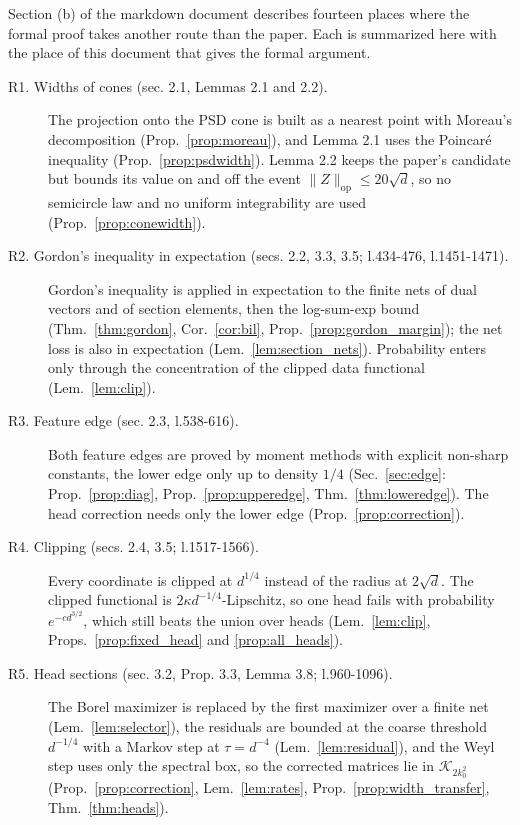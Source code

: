 \documentclass[11pt]{article}
\newcommand{\norm}[1]{\lVert #1\rVert}
\newcommand{\op}{\mathrm{op}}
\newcommand{\sqd}{\sqrt{d}}
\newcommand{\cone}{\mathcal{K}}
\theoremstyle{plain}
\theoremstyle{definition}
\begin{document}
Section (b) of the markdown document describes fourteen places where the
formal proof takes another route than the paper. Each is summarized here
with the place of this document that gives the formal argument.

\begin{description}
\item[R1. Widths of cones (sec. 2.1, Lemmas 2.1 and 2.2).] The projection onto the PSD cone is built as a nearest point with Moreau's decomposition (Prop.~\ref{prop:moreau}), and Lemma 2.1 uses the Poincar\'e inequality (Prop.~\ref{prop:psdwidth}). Lemma 2.2 keeps the paper's candidate but bounds its value on and off the event $\norm{Z}_\op \le 20\sqd$, so no semicircle law and no uniform integrability are used (Prop.~\ref{prop:conewidth}).
\item[R2. Gordon's inequality in expectation (secs. 2.2, 3.3, 3.5; l.434-476, l.1451-1471).] Gordon's inequality is applied in expectation to the finite nets of dual vectors and of section elements, then the log-sum-exp bound (Thm.~\ref{thm:gordon}, Cor.~\ref{cor:bil}, Prop.~\ref{prop:gordon_margin}); the net loss is also in expectation (Lem.~\ref{lem:section_nets}). Probability enters only through the concentration of the clipped data functional (Lem.~\ref{lem:clip}).
\item[R3. Feature edge (sec. 2.3, l.538-616).] Both feature edges are proved by moment methods with explicit non-sharp constants, the lower edge only up to density $1/4$ (Sec.~\ref{sec:edge}: Prop.~\ref{prop:diag}, Prop.~\ref{prop:upperedge}, Thm.~\ref{thm:loweredge}). The head correction needs only the lower edge (Prop.~\ref{prop:correction}).
\item[R4. Clipping (secs. 2.4, 3.5; l.1517-1566).] Every coordinate is clipped at $d^{1/4}$ instead of the radius at $2\sqd$. The clipped functional is $2\kappa d^{-1/4}$-Lipschitz, so one head fails with probability $e^{-cd^{3/2}}$, which still beats the union over heads (Lem.~\ref{lem:clip}, Props.~\ref{prop:fixed_head} and \ref{prop:all_heads}).
\item[R5. Head sections (sec. 3.2, Prop. 3.3, Lemma 3.8; l.960-1096).] The Borel maximizer is replaced by the first maximizer over a finite net (Lem.~\ref{lem:selector}), the residuals are bounded at the coarse threshold $d^{-1/4}$ with a Markov step at $\tau = d^{-4}$ (Lem.~\ref{lem:residual}), and the Weyl step uses only the spectral box, so the corrected matrices lie in $\cone_{2k_0^2}$ (Prop.~\ref{prop:correction}, Lem.~\ref{lem:rates}, Prop.~\ref{prop:width_transfer}, Thm.~\ref{thm:heads}).

\end{description}
\end{document}
